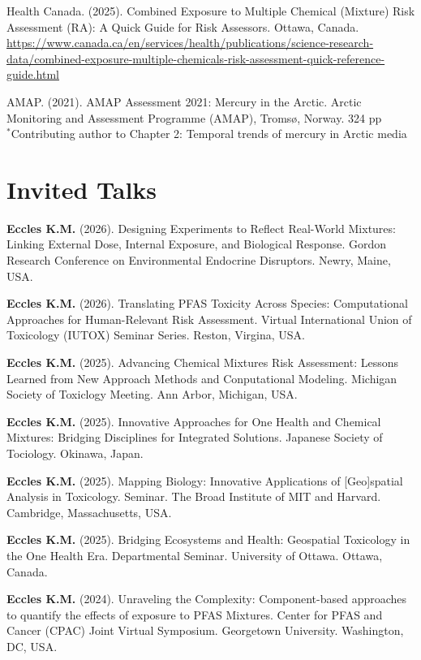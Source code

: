 \documentclass[margin,line]{res}
\begin{document}
\begin{resume}
Health Canada. (2025). Combined Exposure to Multiple Chemical (Mixture) Risk Assessment (RA): A Quick Guide for Risk Assessors. Ottawa, Canada. \url{https://www.canada.ca/en/services/health/publications/science-research-data/combined-exposure-multiple-chemicals-risk-assessment-quick-reference-guide.html}

AMAP. (2021). AMAP Assessment 2021: Mercury in the Arctic. Arctic Monitoring and Assessment Programme (AMAP), Tromsø, Norway. 324 pp\\
$^{*}$Contributing author to Chapter 2: Temporal trends of mercury in Arctic media\\
\vspace*{.1in}

\section{\sc Invited Talks}


\textbf{Eccles K.M.} (2026). Designing Experiments to Reflect Real-World Mixtures: Linking External Dose, Internal  Exposure, and Biological Response. Gordon Research Conference on Environmental Endocrine Disruptors. Newry, Maine, USA.

\textbf{Eccles K.M.} (2026). Translating PFAS Toxicity Across Species: Computational Approaches for Human-Relevant Risk Assessment. Virtual International Union of Toxicology (IUTOX) Seminar Series. Reston, Virgina, USA.

\textbf{Eccles K.M.} (2025). Advancing Chemical Mixtures Risk Assessment: Lessons Learned from New Approach Methods and Conputational Modeling. Michigan Society of Toxiclogy Meeting. Ann Arbor, Michigan, USA.

\textbf{Eccles K.M.} (2025). Innovative Approaches for One Health and Chemical Mixtures: Bridging Disciplines for Integrated Solutions. Japanese Society of Tociology. Okinawa, Japan.

\textbf{Eccles K.M.} (2025). Mapping Biology: Innovative Applications of [Geo]spatial Analysis in Toxicology. Seminar. The Broad Institute of MIT and Harvard. Cambridge, Massachusetts, USA.

\textbf{Eccles K.M.} (2025). Bridging Ecosystems and Health: Geospatial Toxicology in the One Health Era. Departmental Seminar. University of Ottawa. Ottawa, Canada.

\textbf{Eccles K.M.} (2024). Unraveling the Complexity: Component-based approaches to quantify the effects of exposure to PFAS Mixtures. Center for PFAS and Cancer (CPAC) Joint Virtual Symposium. Georgetown University. Washington, DC, USA.


\end{resume}
\end{document}
